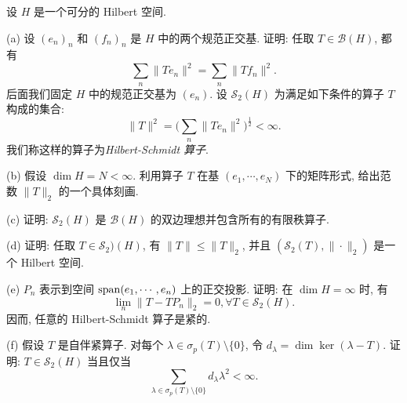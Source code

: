 \begin{exercise}
    设 $H$ 是一个可分的 Hilbert 空间.
    
    (a) 设 $(e_n)_n$ 和 $(f_n)_n$ 是 $H$ 中的两个规范正交基. 证明: 任取 $T\in\mathcal{B}(H)$, 都有
    \[\sum_n \|Te_n\|^2=\sum_n \|Tf_n\|^2.\]
    后面我们固定 $H$ 中的规范正交基为 $(e_n)$.
    设 $\mathcal{S}_2(H)$ 为满足如下条件的算子 $T$ 构成的集合:
    \[\|T\|^2=\biggl(\sum_n \|Te_n\|^2\biggr)^{\frac{1}{2}}<\infty.\]
    我们称这样的算子为\emph{Hilbert-Schmidt 算子}.

    (b) 假设 $\dim H=N<\infty$. 利用算子 $T$ 在基 $(e_1,\cdots,e_N)$ 下的矩阵形式,
    给出范数 $\|T\|_2$ 的一个具体刻画.

    (c) 证明: $\mathcal{S}_2(H)$ 是 $\mathcal{B}(H)$ 的双边理想并包含所有的有限秩算子.

    (d) 证明: 任取 $T\in\mathcal{S}_2)(H)$, 有 $\|T\|\leq\|T\|_2$, 并且 $(\mathcal{S}_2(T),\|\cdot\|_2)$
    是一个 Hilbert 空间.

    (e) $P_n$ 表示到空间 $\operatorname{span}(e_1,\cdots,e_n)$ 上的正交投影.
    证明: 在 $\dim H=\infty$ 时, 有
    \[\lim_n \|T-TP_n\|_2=0,\forall T\in\mathcal{S}_2(H).\]
    因而, 任意的 Hilbert-Schmidt 算子是紧的.

    (f) 假设 $T$ 是自伴紧算子. 对每个 $\lambda\in\sigma_p(T)\setminus\{0\}$,
    令 $d_{\lambda}=\dim\ker(\lambda-T)$. 证明: $T\in\mathcal{S}_2(H)$ 当且仅当
    \[\sum_{\lambda\in\sigma_p(T)\setminus\{0\}}d_{\lambda}\lambda^2<\infty.\]
\end{exercise}